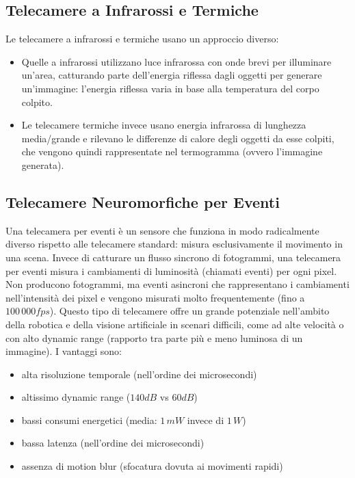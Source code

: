 \documentclass[a4paper,11pt]{article} %
\begin{document}
\subsection{Telecamere a Infrarossi e Termiche}
Le telecamere a infrarossi e termiche usano un approccio diverso:
\begin{itemize}
\item Quelle a infrarossi utilizzano luce infrarossa con onde brevi per illuminare un'area, catturando parte dell'energia riflessa dagli oggetti per generare un'immagine: l'energia riflessa varia in base alla temperatura del corpo colpito.
\item Le telecamere termiche invece usano energia infrarossa di lunghezza media/grande e rilevano le differenze di calore degli oggetti da esse colpiti, che vengono quindi rappresentate nel termogramma (ovvero l'immagine generata).
\end{itemize}

\subsection{Telecamere Neuromorfiche per Eventi}
Una telecamera per eventi è un sensore che funziona in modo radicalmente diverso rispetto alle telecamere standard: misura esclusivamente il movimento in una scena. Invece di catturare un flusso sincrono di fotogrammi, una telecamera per eventi misura i cambiamenti di luminosità (chiamati eventi) per ogni pixel. Non producono fotogrammi, ma eventi asincroni che rappresentano i cambiamenti nell'intensità dei pixel e vengono misurati molto frequentemente (fino a $100 \, 000 fps$).
Questo tipo di telecamere offre un grande potenziale nell'ambito della robotica e della visione artificiale in scenari difficili, come ad alte velocità o con alto dynamic range (rapporto tra parte più e meno luminosa di un immagine). I vantaggi sono:
\begin{itemize}
\item alta risoluzione temporale (nell'ordine dei microsecondi)
\item altissimo dynamic range ($140dB$ vs $60dB$)
\item bassi consumi energetici (media: $ 1\, mW$ invece di $1 \, W$)
\item bassa latenza (nell'ordine dei microsecondi)
\item assenza di motion blur (sfocatura dovuta ai movimenti rapidi)
\end{itemize}
\end{document}
